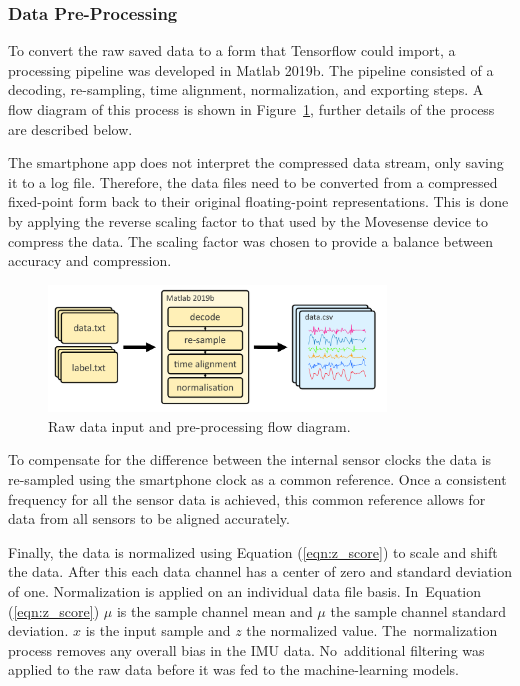 \subsubsection{Data Pre-Processing}
\label{sec:pre-processing}
To convert the raw saved data to a form that Tensorflow could import, a processing pipeline was developed in Matlab 2019b. The pipeline consisted of a decoding, re-sampling, time alignment, normalization, and exporting steps. A flow diagram of this process is shown in Figure~\ref{fig:data_processing}, further details of the process are described below.

The smartphone app does not interpret the compressed data stream, only saving it to a log file. Therefore, the data files need to be converted from a compressed fixed-point form back to their original floating-point representations. This is done by applying the reverse scaling factor to that used by the Movesense device to compress the data. The scaling factor was chosen to provide a balance between accuracy and compression.

\begin{figure}[!hbt]
    \centering
    \includegraphics[width=0.8\textwidth]{content/4-LSTM_Behaviour/data_processing.pdf}
    \caption{Raw data input and pre-processing flow diagram.}
    \label{fig:data_processing}
\end{figure}


To compensate for the difference between the internal sensor clocks the data is re-sampled using the smartphone clock as a common reference. Once a consistent frequency for all the sensor data is achieved, this common reference allows for data from all sensors to be aligned accurately.

Finally, the data is normalized using Equation (\ref{eqn:z_score}) to scale and shift the data. After this each data channel has a center of zero and standard deviation of one. Normalization is applied on an individual data file basis. In~Equation (\ref{eqn:z_score}) $\mu$ is the sample channel mean and $\mu$ the sample channel standard deviation. $x$ is the input sample and $z$ the normalized value. The~normalization process removes any overall bias in the IMU data. No~additional filtering was applied to the raw data before it was fed to the machine-learning models.

